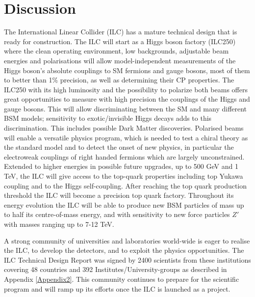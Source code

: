 \documentclass[%
 reprint,
 amsmath,amssymb,
 aps,
]{revtex4-1}
\newcommand{\todo}[1]{\textcolor{red}{{#1}}}
\begin{document}
\section{\label{sec:discuss}Discussion}



The International Linear Collider (ILC) has a mature technical design that is ready for construction. The ILC will start as a Higgs boson factory (ILC250) where the clean operating environment, low backgrounds, adjustable beam energies and polarisations will allow model-independent measurements of the Higgs boson's absolute couplings to SM fermions and gauge bosons, most of them to better than 1\% precision, as well as determining their CP properties. The ILC250 with its high luminosity and the possibility to polarize both beams offers great opportunities to measure with high precision the couplings of the Higgs and gauge bosons. This will allow discriminating between the SM and many different BSM models; sensitivity to exotic/invisible Higgs decays adds to this discrimination. This includes  possible Dark Matter discoveries. Polarised beams will enable a versatile physics program, which is needed to test a chiral theory as the standard model and to detect the onset of new physics, in particular the electroweak couplings of right handed fermions which are largely unconstrained. Extended to higher energies in possible future upgrades, up to 500 GeV and 1 TeV, the ILC will give access to the top-quark properties including top Yukawa coupling and to the Higgs self-coupling. After reaching the top quark production threshold the ILC will become a precision top quark factory. Throughout its energy evolution  the ILC will be able to produce new BSM particles of mass up to half its centre-of-mass energy, and with sensitivity to new force particles $Z'$ with masses ranging up to 7-12 TeV. 

A strong community of universities and laboratories world-wide is eager to realise the ILC, to develop the detectors, and to exploit the physics opportunities.  The ILC Technical Design Report was signed by
2400 scientists from these institutions covering 48 countries and 392 Institutes/University-groups as described in Appendix \ref{Appendix2}.  This community continues to prepare for the scientific program and
will ramp up its efforts once the ILC is launched as a project.
\end{document}
